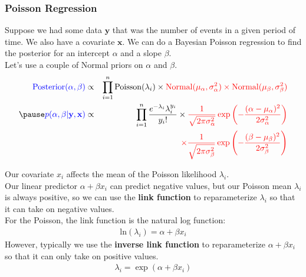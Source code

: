 \documentclass{beamer}
\begin{document}
\begin{frame}
\frametitle{Poisson Regression}
\pause
Suppose we had some data $\mathbf{y}$ that was the number of events in
a given period of time.  \pause We also have a covariate
$\mathbf{x}$. \pause We can do a Bayesian Poisson regression to find
the posterior for an intercept $\alpha$ and a slope $\beta$. \\
\bigskip
\pause
Let's use a couple of Normal priors on $\alpha$ and $\beta$. 
\footnotesize
\begin{eqnarray*}
\blue{\mathrm{Posterior}(\alpha, \beta)} &\propto& \prod_{i=1}^n
\mathrm{Poisson}(\lambda_i) \times \red{\mathrm{Normal}(\mu_{\alpha},
\sigma^2_{\alpha}) \times \mathrm{Normal}(\mu_{\beta}, \sigma^2_{\beta})} \\
\pause
\blue{p(\alpha, \beta | \mathbf{y}, \mathbf{x})} &\propto&
\prod_{i=1}^n \frac{e^{-\lambda_i} \lambda_i^{y_i}}{y_i !} \times
\red{\frac{1}{\sqrt{2\pi \sigma^2_{\alpha}}} \exp \left(-
\frac{(\alpha - \mu_{\alpha})^2}{2 \sigma_{\alpha}^2}\right)}\\
&\phantom{\propto}& \red{\times \frac{1}{\sqrt{2\pi \sigma^2_{\beta}}} \exp \left(-\frac{(\beta - \mu_{\beta})^2}{2 \sigma_{\beta}^2}\right)} 
\end{eqnarray*}
\end{frame}

\begin{frame}
Our covariate $x_i$ affects the mean of the Poisson likelihood
$\lambda_i$.  \\
\bigskip
\pause
Our linear predictor $\alpha + \beta x_i$ can predict negative values,
but our Poisson mean $\lambda_i$ is always positive, so we can use the
\textbf{link function} to reparameterize $\lambda_i$ so that it can take on
negative values.\\

\bigskip
\pause
For the Poisson, the link function is the natural log function:
\begin{eqnarray*}
\mathrm{ln} (\lambda_i) = \alpha + \beta x_i
\end{eqnarray*}
\pause
However, typically we use the \textbf{inverse link function} to
reparameterize $\alpha + \beta x_i$ so that it can only take on
positive values.
\pause
\begin{eqnarray*}
\lambda_i = \exp (\alpha + \beta x_i)
\end{eqnarray*}
\end{frame}
\end{document}
